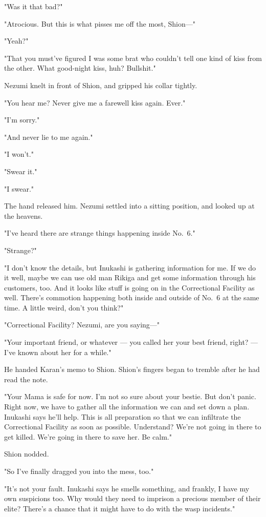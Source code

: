 "Was it that bad?"

"Atrocious. But this is what pisses me off the most, Shion---"

"Yeah?"

"That you must've figured I was some brat who couldn't tell one kind of
kiss from the other. What good-night kiss, huh? Bullshit."

Nezumi knelt in front of Shion, and gripped his collar tightly.

"You hear me? Never give me a farewell kiss again. Ever."

"I'm sorry."

"And never lie to me again."

"I won't."

"Swear it."

"I swear."

The hand released him. Nezumi settled into a sitting position, and
looked up at the heavens.

"I've heard there are strange things happening inside No.~6."

"Strange?"

"I don't know the details, but Inukashi is gathering information for me.
If we do it well, maybe we can use old man Rikiga and get some
information through his customers, too. And it looks like stuff is going
on in the Correctional Facility as well. There's commotion happening
both inside and outside of No.~6 at the same time. A little weird, don't
you think?"

"Correctional Facility? Nezumi, are you saying---"

"Your important friend, or whatever --- you called her your best friend,
right? --- I've known about her for a while."

He handed Karan's memo to Shion. Shion's fingers began to tremble after
he had read the note.

"Your Mama is safe for now. I'm not so sure about your bestie. But don't
panic. Right now, we have to gather all the information we can and set
down a plan. Inukashi says he'll help. This is all preparation so that
we can infiltrate the Correctional Facility as soon as possible.
Understand? We're not going in there to get killed. We're going in there
to save her. Be calm."

Shion nodded.

"So I've finally dragged you into the mess, too."

"It's not your fault. Inukashi says he smells something, and frankly, I
have my own suspicions too. Why would they need to imprison a precious
member of their elite? There's a chance that it might have to do with
the wasp incidents."

